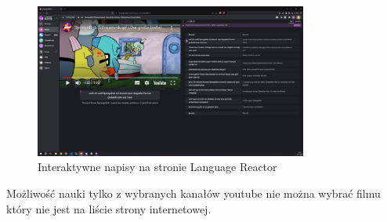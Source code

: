 \begin{figure}[H]
    \centering
    \includegraphics[width=0.8\textwidth]{IMAGE/LanguageReactor.png}
    \caption{Interaktywne napisy na stronie Language Reactor}
    \label{fig:Language_reactor}
\end{figure}

Możliwość nauki tylko z wybranych kanałów youtube nie można wybrać filmu który nie jest na liście strony internetowej.
